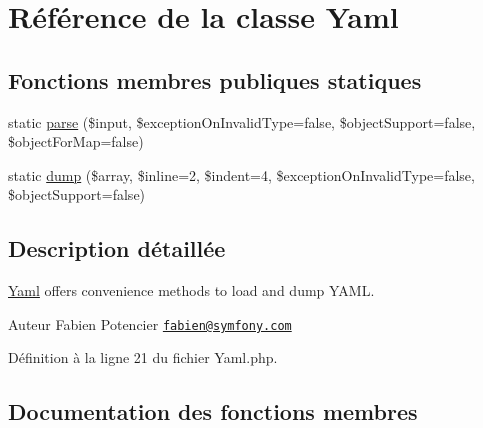 \hypertarget{class_symfony_1_1_component_1_1_yaml_1_1_yaml}{}\section{Référence de la classe Yaml}
\label{class_symfony_1_1_component_1_1_yaml_1_1_yaml}
\subsection*{Fonctions membres publiques statiques}
\begin{DoxyCompactItemize}
\item 
static \hyperlink{class_symfony_1_1_component_1_1_yaml_1_1_yaml_ac2bb245be7b3c736b0e8d6703b852724}{parse} (\$input, \$exception\+On\+Invalid\+Type=false, \$object\+Support=false, \$object\+For\+Map=false)
\item 
static \hyperlink{class_symfony_1_1_component_1_1_yaml_1_1_yaml_ae9e8dbe43eea0393f75c12555a6394be}{dump} (\$array, \$inline=2, \$indent=4, \$exception\+On\+Invalid\+Type=false, \$object\+Support=false)
\end{DoxyCompactItemize}


\subsection{Description détaillée}
\hyperlink{class_symfony_1_1_component_1_1_yaml_1_1_yaml}{Yaml} offers convenience methods to load and dump Y\+A\+ML.

\begin{DoxyAuthor}{Auteur}
Fabien Potencier \href{mailto:fabien@symfony.com}{\tt fabien@symfony.\+com} 
\end{DoxyAuthor}


Définition à la ligne 21 du fichier Yaml.\+php.



\subsection{Documentation des fonctions membres}
